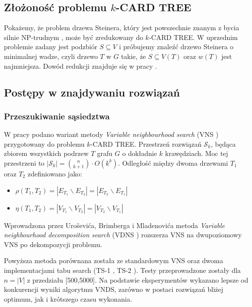 \documentclass[12pt]{article}
\begin{document}
\subsection{Złożoność problemu $k$-CARD TREE}

Pokażemy, że problem drzewa Steinera, który jest powszechnie znanym z bycia silnie NP-trudnym \cite{steiner}, może być zredukowany do $k$-CARD TREE. W uprzednim problemie zadany jest podzbiór $S \subseteq V$ i próbujemy znaleźć drzewo Steinera o minimalnej wadze, czyli drzewo $T$ w $G$ takie, że $S \subseteq V(T)$ oraz $w(T)$ jest najmniejsza. Dowód redukcji znajduje się w pracy \cite{k_card_trees}.

\subsection{Postępy w znajdywaniu rozwiązań}

\subsubsection{Przeszukiwanie sąsiedztwa}

W pracy \cite{neighbourhood} podano wariant metody \textit{Variable neighbourhood search} (VNS \cite{vns}) przygotowany do problemu $k$-CARD TREE. Przestrzeń rozwiązań $\mathcal{S}_k$, będąca zbiorem wszystkich podrzew $T$ grafu $G$ o dokładnie $k$ krawędziach. Moc tej przestrzeni to $|\mathcal{S}_k| = \binom{n}{k+1} \cdot O(k^k)$. Odległość między dwoma drzewami $T_1$ oraz $T_2$ zdefiniowano jako:
\begin{itemize}
  \item $\rho(T_1,T_2) = |E_{T_1} \backslash E_{T_2}| = |E_{T_2} \backslash E_{T_1}|$
  \item $\eta(T_1,T_2) = |V_{T_1} \backslash V_{T_2}| = |V_{T_2} \backslash V_{T_1}|$
\end{itemize}

Wprowadzona przez Uroševića, Brimberga i Mladenovića metoda \textit{Variable neighbourhood decomposition search} (VDNS \cite{vnds}) rozszerza VNS na dwupoziomowy VNS po dekompozycji problemu.

Powyższa metoda porównana została ze standardowym VNS oraz dwoma implementacjami tabu search (TS-1 \cite{ts1}, TS-2 \cite{ts2}). Testy przeprowadzone zostały dla $n=|V|$ z przedziału [500,5000]. Na podstawie eksperymentów wykazano lepsze od konkurencji wyniki algorytmu VNDS, zarówno w postaci rozwiązań bliżej optimum, jak i krótszego czasu wykonania.
\end{document}
